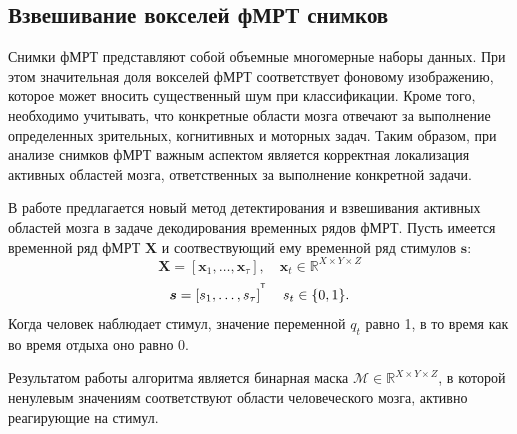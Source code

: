 \documentclass[a4paper, 12pt]{extarticle}
\begin{document}
\subsection{Взвешивание вокселей фМРТ снимков}
Снимки фМРТ представляют собой объемные многомерные наборы данных. 
При этом значительная доля вокселей фМРТ соответствует фоновому изображению, которое может вносить существенный шум при классификации. 
Кроме того, необходимо учитывать, что конкретные области мозга отвечают за выполнение определенных зрительных, когнитивных и моторных задач. 
Таким образом, при анализе снимков фМРТ важным аспектом является корректная локализация активных областей мозга, ответственных за выполнение конкретной задачи.

В работе предлагается новый метод детектирования и взвешивания активных областей мозга в задаче декодирования временных рядов фМРТ. 
Пусть имеется временной ряд фМРТ $\bm{X}$ и соотвествующий ему временной ряд стимулов $\bm{s}$:
\begin{equation*}
	\bm{X} = \left[\bm{x}_1, \dots, \bm{x}_{\tau}\right],\quad \bm{x}_{t} \in \mathbb{R}^{X \times Y \times Z}
\end{equation*}
\begin{equation*}
	\bm{s} = \left[s_1, \dots, s_{\tau}\right]^{^{\mathsf{T}}}\quad s_t \in \{0, 1\}.
\end{equation*}
Когда человек наблюдает стимул, значение переменной $q_t$ равно 1, в то время как во время отдыха оно равно 0. 

Результатом работы алгоритма является бинарная маска $\mathcal{M} \in  \mathbb{R}^{X \times Y \times Z}$, в которой ненулевым значениям соответствуют области человеческого мозга, активно реагирующие на стимул.
\end{document}

